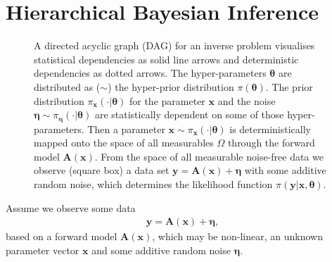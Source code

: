 \section{Hierarchical Bayesian Inference}
\label{sec:bayes}
\begin{figure}[ht!]
	\centering
	\caption[Hierarchical Bayesian Model]{A directed acyclic graph (DAG) for an inverse problem visualises statistical dependencies as solid line arrows and deterministic dependencies as dotted arrows.
		The hyper-parameters $\bm{\theta}$ are distributed as ($\sim$) the hyper-prior distribution $\pi(\bm{\theta})$.
		The prior distribution $ \pi_{\bm{x}}(\cdot|\bm{\theta})$ for the parameter $\bm{x}$ and the noise  $\bm{\eta} \sim \pi_{\bm{\eta}}(\cdot|\bm{\theta})$ are statistically dependent on some of those hyper-parameters.
		Then a parameter $\bm{x} \sim \pi_{\bm{x}}(\cdot|\bm{\theta})$ is deterministically mapped onto the space of all measurables $\Omega$ through the forward model $\bm{A}(\bm{x})$.
		From the space of all measurable noise-free data we observe (square box) a data set $\bm{y} = \bm{A}(\bm{x}) + \bm{\eta}$ with some additive random noise, which determines the likelihood function $\pi(\bm{y}|\bm{x},\bm{\theta})$.}
	\label{fig:FirstDAG}
\end{figure}

Assume we observe some data
\begin{align}
	\bm{y} = \bm{A} (\bm{x}) + \bm{\eta},
	\label{eq:NonLinDat}
\end{align}
based on a forward model $\bm{A}(\bm{x})$, which may be non-linear, an unknown parameter vector $\bm{x}$ and some additive random noise $\bm{\eta}$.

